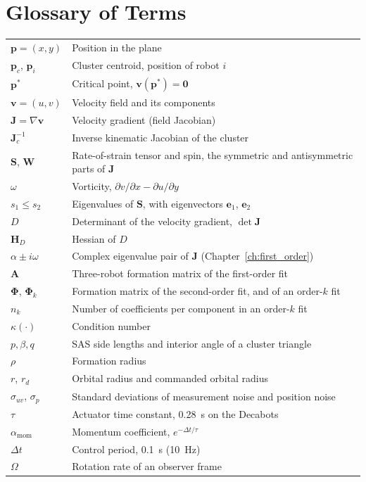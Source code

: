 \documentclass[12pt, letterpaper, oneside]{report}
\begin{document}
\clearpage

\chapter*{Glossary of Terms}

\begin{table}[h]
\centering
\begin{tabular}{l p{4.2in}}
$\mathbf{p} = (x, y)$ & Position in the plane \\
$\mathbf{p}_c$, $\mathbf{p}_i$ & Cluster centroid, position of robot $i$ \\
$\mathbf{p}^*$ & Critical point, $\mathbf{v}(\mathbf{p}^*) = \mathbf{0}$ \\
$\mathbf{v} = (u, v)$ & Velocity field and its components \\
$\mathbf{J} = \nabla\mathbf{v}$ & Velocity gradient (field Jacobian) \\
$\mathbf{J}_c^{-1}$ & Inverse kinematic Jacobian of the cluster \\
$\mathbf{S}$, $\mathbf{W}$ & Rate-of-strain tensor and spin, the symmetric and antisymmetric parts of $\mathbf{J}$ \\
$\omega$ & Vorticity, $\partial v/\partial x - \partial u/\partial y$ \\
$s_1 \leq s_2$ & Eigenvalues of $\mathbf{S}$, with eigenvectors $\mathbf{e}_1$, $\mathbf{e}_2$ \\
$D$ & Determinant of the velocity gradient, $\det\mathbf{J}$ \\
$\mathbf{H}_D$ & Hessian of $D$ \\
$\alpha \pm i\omega$ & Complex eigenvalue pair of $\mathbf{J}$ (Chapter~\ref{ch:first_order}) \\
$\mathbf{A}$ & Three-robot formation matrix of the first-order fit \\
$\boldsymbol{\Phi}$, $\boldsymbol{\Phi}_k$ & Formation matrix of the second-order fit, and of an order-$k$ fit \\
$n_k$ & Number of coefficients per component in an order-$k$ fit \\
$\kappa(\cdot)$ & Condition number \\
$p, \beta, q$ & SAS side lengths and interior angle of a cluster triangle \\
$\rho$ & Formation radius \\
$r$, $r_d$ & Orbital radius and commanded orbital radius \\
$\sigma_{uv}$, $\sigma_p$ & Standard deviations of measurement noise and position noise \\
$\tau$ & Actuator time constant, 0.28~s on the Decabots \\
$\alpha_{\text{mom}}$ & Momentum coefficient, $e^{-\Delta t/\tau}$ \\
$\Delta t$ & Control period, 0.1~s (10~Hz) \\
$\Omega$ & Rotation rate of an observer frame \\
\end{tabular}
\end{table}
\end{document}
